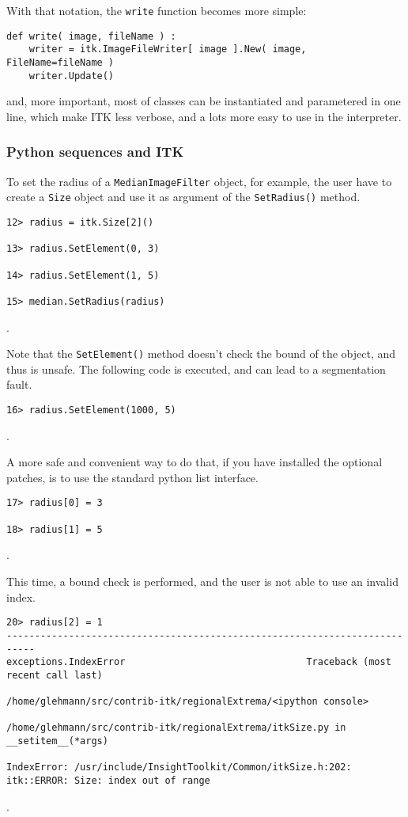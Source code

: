 \documentclass{InsightArticle}
\begin{document}
With that notation, the \verb$write$ function becomes more simple:
\begin{verbatim}
def write( image, fileName ) :
    writer = itk.ImageFileWriter[ image ].New( image, FileName=fileName )
    writer.Update()
\end{verbatim}

and, more important, most of classes can be instantiated and parametered in one line,
which make ITK less verbose, and a lots more easy to use in the interpreter.


     \subsubsection{Python sequences and ITK}

To set the radius of a \verb$MedianImageFilter$ object, for example, the user have to
create a \verb$Size$ object and use it as argument of the \verb$SetRadius()$ method.
\begin{verbatim}
12> radius = itk.Size[2]()

13> radius.SetElement(0, 3)

14> radius.SetElement(1, 5)

15> median.SetRadius(radius)
\end{verbatim}.

Note that the \verb$SetElement()$ method doesn't check the bound of the object, and thus
is unsafe. The following code is executed, and can lead to a segmentation fault.

\begin{verbatim}
16> radius.SetElement(1000, 5)
\end{verbatim}.

A more safe and convenient way to do that, if you have installed the optional patches,
is to use the standard python list interface.

\begin{verbatim}
17> radius[0] = 3

18> radius[1] = 5
\end{verbatim}.

This time, a bound check is performed, and the user is not able to use an invalid index.

\begin{verbatim}
20> radius[2] = 1
---------------------------------------------------------------------------
exceptions.IndexError                                Traceback (most recent call last)

/home/glehmann/src/contrib-itk/regionalExtrema/<ipython console>

/home/glehmann/src/contrib-itk/regionalExtrema/itkSize.py in __setitem__(*args)

IndexError: /usr/include/InsightToolkit/Common/itkSize.h:202:
itk::ERROR: Size: index out of range
\end{verbatim}.
\end{document}
